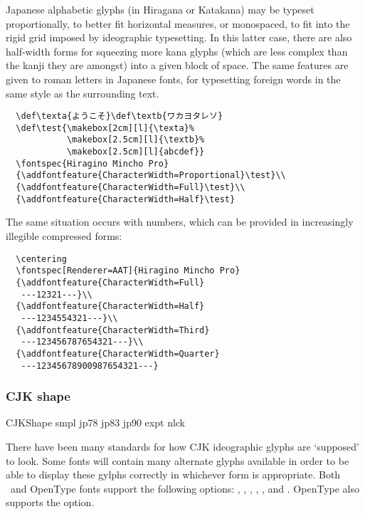 \documentclass[a4paper]{l3doc}
\begin{document}
Japanese alphabetic glyphs (in Hiragana or Katakana) may be typeset
proportionally, to better fit horizontal measures, or monospaced, to
fit into the rigid grid imposed by ideographic typesetting. In this
latter case, there are also half-width forms for squeezing more kana
glyphs (which are less complex than the kanji they are amongst) into
a given block of space. The same features are given to roman letters
in Japanese fonts, for typesetting foreign words in the same style
as the surrounding text.
\begin{Verbatim}
  \def\texta{ようこそ}\def\textb{ワカヨタレソ}
  \def\test{\makebox[2cm][l]{\texta}%
            \makebox[2.5cm][l]{\textb}%
            \makebox[2.5cm][l]{abcdef}}
  \fontspec{Hiragino Mincho Pro}
  {\addfontfeature{CharacterWidth=Proportional}\test}\\
  {\addfontfeature{CharacterWidth=Full}\test}\\
  {\addfontfeature{CharacterWidth=Half}\test}
\end{Verbatim}

The same situation occurs with numbers, which can be provided in
increasingly illegible compressed forms:
\begin{Verbatim}
  \centering
  \fontspec[Renderer=AAT]{Hiragino Mincho Pro}
  {\addfontfeature{CharacterWidth=Full}
   ---12321---}\\
  {\addfontfeature{CharacterWidth=Half}
   ---1234554321---}\\
  {\addfontfeature{CharacterWidth=Third}
   ---123456787654321---}\\
  {\addfontfeature{CharacterWidth=Quarter}
   ---12345678900987654321---}
\end{Verbatim}


\subsubsection{CJK shape}

\begin{features}{CJKShape}
 {smpl}
    {jp78}
    {jp83}
    {jp90}
     {expt}
        {nlck}
\end{features}

There have been many standards for how CJK ideographic
glyphs are `supposed' to look. Some fonts will contain many alternate
glyphs available in order to be able to display these gylphs
correctly in whichever form is appropriate. Both \AAT\ and OpenType
fonts support the following  options:
, , , ,
, and . OpenType also supports the  option.
\end{document}
